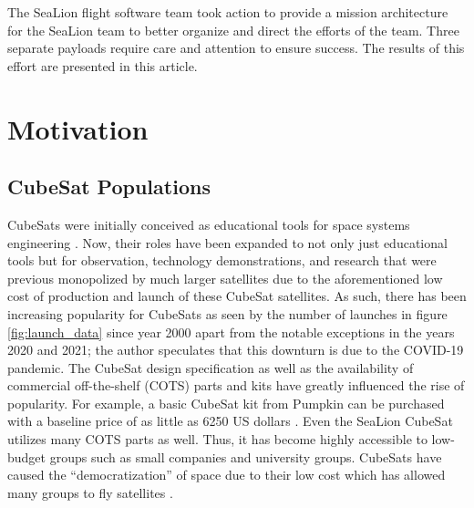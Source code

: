 \documentclass[journal,article,submit,pdftex,moreauthors]{Definitions/mdpi}
\begin{document}
The SeaLion flight software team took action to provide a mission architecture for the SeaLion team to better organize and direct the efforts of the team.  Three separate payloads require care and attention to ensure success.  The results of this effort are presented in this article. 

\section{Motivation}
\subsection{CubeSat Populations}

CubeSats were initially conceived as educational tools for space systems engineering \cite{heidt_new}.  Now, their roles have been expanded to not only just educational tools but for observation, technology demonstrations, and research that were previous monopolized by much larger satellites due to the aforementioned low cost of production and launch of these CubeSat satellites.  As such, there has been increasing popularity for CubeSats as seen by the number of launches in figure \ref{fig:launch_data} since year 2000 \cite{swartwout_data} apart from the notable exceptions in the years 2020 and 2021; the author speculates that this downturn is due to the COVID-19 pandemic.  The CubeSat design specification \cite{cds_rev14} as well as the availability of commercial off-the-shelf (COTS) parts and kits have greatly influenced the rise of popularity.  For example, a basic CubeSat kit from Pumpkin can be purchased with a baseline price of as little as 6250 US dollars \cite{pumpkin_cubesat}.  Even the SeaLion CubeSat utilizes many COTS parts as well.  Thus, it has become highly accessible to low-budget groups such as small companies and university groups.  CubeSats have caused the “democratization” of space due to their low cost which has allowed many groups to fly satellites \cite{cubesat_handbook}.  
\end{document}
